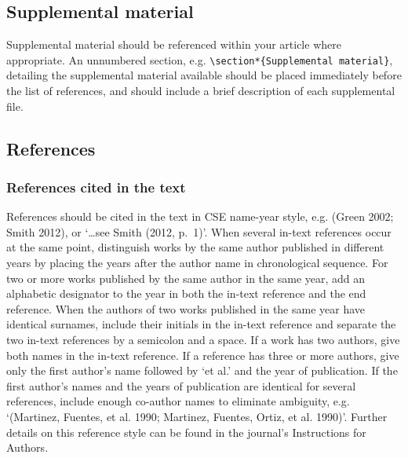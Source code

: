 \documentclass{gCMB2e}
\begin{document}
\subsection{Supplemental material}

Supplemental material should be referenced within your article where appropriate. An unnumbered section, e.g. \verb"\section*{Supplemental material}", detailing the supplemental material available should be placed immediately before the list of references, and should include a brief description of each supplemental file.


\subsection{References}\label{refs}

\subsubsection{References cited in the text}

References should be cited in the text in CSE name-year style, e.g. (Green 2002; Smith 2012), or `\ldots see Smith (2012, p.~1)'. When several in-text references occur at the same point, distinguish works by the same author published in different years by placing the years after the author name in chronological sequence. For two or more works published by the same author in the same year, add an alphabetic designator to the year in both the in-text reference and the end reference. When the authors of two works published in the same year have identical surnames, include their initials in the in-text reference and separate the two in-text references by a semicolon and a space. If a work has two authors, give both names in the in-text reference. If a reference has three or more authors, give only the first author's name followed by `et al.' and the year of publication. If the first author's names and the years of publication are identical for several references, include enough co-author names to eliminate ambiguity, e.g. `(Martinez, Fuentes, et al. 1990; Martinez, Fuentes, Ortiz, et al. 1990)'. Further details on this reference style can be found in the journal's Instructions for Authors.
\end{document}
